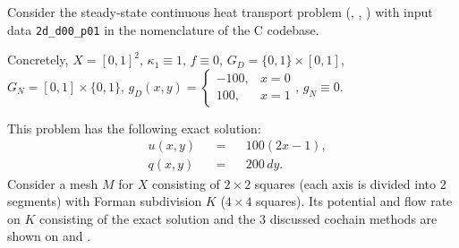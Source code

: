 \begin{example}
  \label{idec/diffusion/continuous/steady_state/examples/2d_d00_p01-example}
  Consider the steady-state continuous heat transport problem
  (,
   ,
   )
  with input data \verb|2d_d00_p01| in the nomenclature of the C codebase.

  Concretely,
    $X = [0, 1]^2$,
    $\kappa_1 \equiv 1$,
    $f \equiv 0$,
    $G_D = \{0, 1\} \times [0, 1]$,
    $G_N = [0, 1] \times \{0, 1\}$,
    $g_D(x, y) = \begin{cases} -100, & x = 0 \\ 100, & x = 1 \end{cases}$,
    $g_N \equiv 0$.

  This problem has the following exact solution:
  \begin{subequations}
    \begin{alignat}{3}
      & u(x, y) && = && 100 (2 x - 1), \\
      & q(x, y) && = && 200\, d y.
    \end{alignat}
  \end{subequations}
  Consider a mesh $M$ for $X$ consisting of $2 \times 2$ squares (each axis is
  divided into $2$ segments) with Forman subdivision $K$ ($4 \times 4$ squares).
  Its potential and flow rate on $K$ consisting of the exact solution and the
  $3$ discussed cochain methods are shown on
  and
  .
\end{example}
